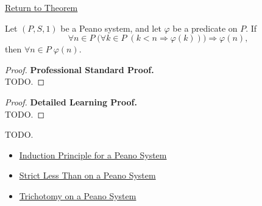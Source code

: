 \newpage
{}
\label{prf:strong-induction-on-peano-system}

\begin{remark*}[Return]
\hyperref[thm:strong-induction-on-peano-system]{Return to Theorem}
\end{remark*}

\begin{theorem*}
Let $(P,S,1)$ be a Peano system, and let $\varphi$ be a predicate on $P$.
If
\[
\forall n \in P\;
\bigl(\forall k \in P\;(k < n \Longrightarrow \varphi(k))\bigr)
\Longrightarrow \varphi(n),
\]
then $\forall n \in P\;\varphi(n)$.
\end{theorem*}

\begin{proof}
\textbf{Professional Standard Proof.}~\\
TODO.
\end{proof}

\begin{proof}
\textbf{Detailed Learning Proof.}~\\
TODO.
\end{proof}

\begin{remark*}
TODO.
\end{remark*}

\begin{dependencies}
\begin{itemize}
  \item \hyperref[thm:induction-principle-for-peano-system]{Induction Principle for a Peano System}
  \item \hyperref[def:strict-less-than-on-peano-system]{Strict Less Than on a Peano System}
  \item \hyperref[thm:trichotomy-on-peano-system]{Trichotomy on a Peano System}
\end{itemize}
\end{dependencies}
